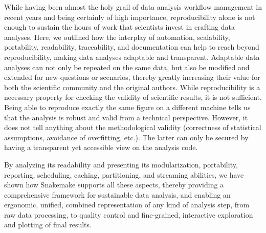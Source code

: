 \documentclass[10pt,a4paper,twocolumn]{article}
\begin{document}
While having been almost the holy grail of data analysis workflow management in recent years and being certainly of high importance, reproducibility alone is not enough to sustain the hours of work that scientists invest in crafting data analyses.
Here, we outlined how the interplay of automation, scalability, portability, readability, traceability, and documentation can help to reach beyond reproducibility, making data analyses adaptable and transparent.
Adaptable data analyses can not only be repeated on the same data, but also be modified and extended for new questions or scenarios, thereby greatly increasing their value for both the scientific community and the original authors.
While reproducibility is a necessary property for checking the validity of scientific results, it is not sufficient.
Being able to reproduce exactly the same figure on a different machine tells us that the analysis is robust and valid from a technical perspective.
However, it does not tell anything about the methodological validity (correctness of statistical assumptions, avoidance of overfitting, etc.).
The latter can only be secured by having a transparent yet accessible view on the analysis code.

By analyzing its readability and presenting its modularization, portability, reporting, scheduling, caching, partitioning, and streaming abilities, we have shown how Snakemake supports all these aspects, thereby providing a comprehensive framework for sustainable data analysis, and enabling an ergonomic, unified, combined representation of any kind of analysis step, from raw data processing, to quality control and fine-grained, interactive exploration and plotting of final results.
\end{document}
